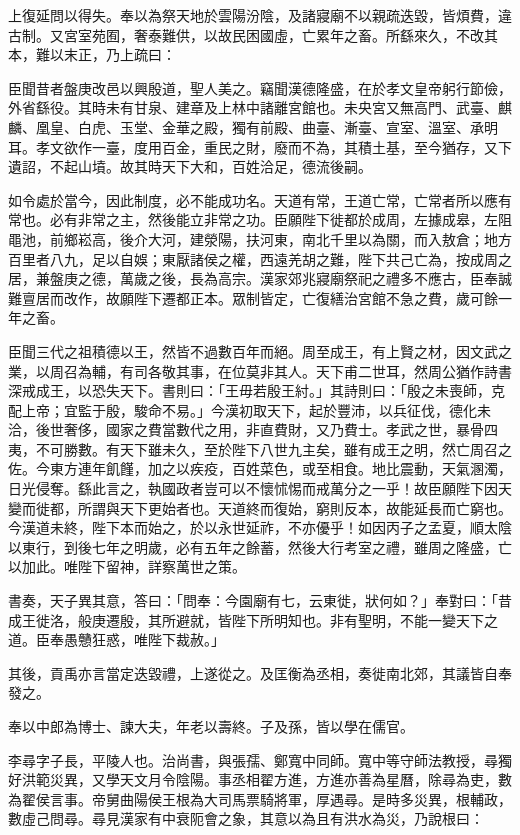 \begin{pinyinscope}
上復延問以得失。奉以為祭天地於雲陽汾陰，及諸寢廟不以親疏迭毀，皆煩費，違古制。又宮室苑囿，奢泰難供，以故民困國虛，亡累年之畜。所繇來久，不改其本，難以末正，乃上疏曰：

臣聞昔者盤庚改邑以興殷道，聖人美之。竊聞漢德隆盛，在於孝文皇帝躬行節儉，外省繇役。其時未有甘泉、建章及上林中諸離宮館也。未央宮又無高門、武臺、麒麟、凰皇、白虎、玉堂、金華之殿，獨有前殿、曲臺、漸臺、宣室、溫室、承明耳。孝文欲作一臺，度用百金，重民之財，廢而不為，其積土基，至今猶存，又下遺詔，不起山墳。故其時天下大和，百姓洽足，德流後嗣。

如令處於當今，因此制度，必不能成功名。天道有常，王道亡常，亡常者所以應有常也。必有非常之主，然後能立非常之功。臣願陛下徙都於成周，左據成皋，左阻黽池，前鄉崧高，後介大河，建滎陽，扶河東，南北千里以為關，而入敖倉；地方百里者八九，足以自娛；東厭諸侯之權，西遠羌胡之難，陛下共己亡為，按成周之居，兼盤庚之德，萬歲之後，長為高宗。漢家郊兆寢廟祭祀之禮多不應古，臣奉誠難亶居而改作，故願陛下遷都正本。眾制皆定，亡復繕治宮館不急之費，歲可餘一年之畜。

臣聞三代之祖積德以王，然皆不過數百年而絕。周至成王，有上賢之材，因文武之業，以周召為輔，有司各敬其事，在位莫非其人。天下甫二世耳，然周公猶作詩書深戒成王，以恐失天下。書則曰：「王毋若殷王紂。」其詩則曰：「殷之未喪師，克配上帝；宜監于殷，駿命不易。」今漢初取天下，起於豐沛，以兵征伐，德化未洽，後世奢侈，國家之費當數代之用，非直費財，又乃費士。孝武之世，暴骨四夷，不可勝數。有天下雖未久，至於陛下八世九主矣，雖有成王之明，然亡周召之佐。今東方連年飢饉，加之以疾疫，百姓菜色，或至相食。地比震動，天氣溷濁，日光侵奪。繇此言之，執國政者豈可以不懷怵惕而戒萬分之一乎！故臣願陛下因天變而徙都，所謂與天下更始者也。天道終而復始，窮則反本，故能延長而亡窮也。今漢道未終，陛下本而始之，於以永世延祚，不亦優乎！如因丙子之孟夏，順太陰以東行，到後七年之明歲，必有五年之餘蓄，然後大行考室之禮，雖周之隆盛，亡以加此。唯陛下留神，詳察萬世之策。

書奏，天子異其意，答曰：「問奉：今園廟有七，云東徙，狀何如？」奉對曰：「昔成王徙洛，般庚遷殷，其所避就，皆陛下所明知也。非有聖明，不能一變天下之道。臣奉愚戇狂惑，唯陛下裁赦。」

其後，貢禹亦言當定迭毀禮，上遂從之。及匡衡為丞相，奏徙南北郊，其議皆自奉發之。

奉以中郎為博士、諫大夫，年老以壽終。子及孫，皆以學在儒官。

李尋字子長，平陵人也。治尚書，與張孺、鄭寬中同師。寬中等守師法教授，尋獨好洪範災異，又學天文月令陰陽。事丞相翟方進，方進亦善為星曆，除尋為吏，數為翟侯言事。帝舅曲陽侯王根為大司馬票騎將軍，厚遇尋。是時多災異，根輔政，數虛己問尋。尋見漢家有中衰阨會之象，其意以為且有洪水為災，乃說根曰：


\end{pinyinscope}
